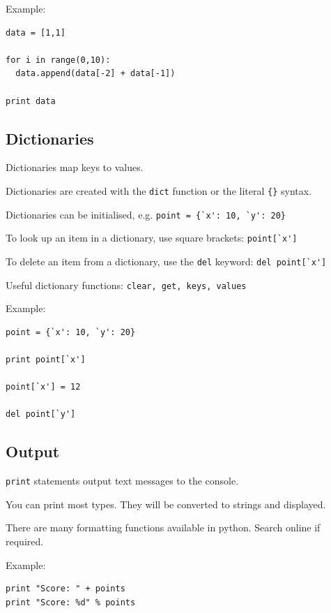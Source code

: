 \documentclass[12pt,a4paper,twoside]{article}
\renewcommand{\_}{\texttt{\symbol{95}}}
\begin{document}
Example:
\begin{verbatim}
data = [1,1]

for i in range(0,10):
  data.append(data[-2] + data[-1])

print data
\end{verbatim}

\subsection{Dictionaries}

\begin{bulletlist}
\item Dictionaries map keys to values.
\item Dictionaries are created with the \verb^dict^ function or the literal \verb^{}^ syntax.
\item Dictionaries can be initialised, e.g. \verb^point = {`x': 10, `y': 20}^
\item To look up an item in a dictionary, use square brackets: \verb^point[`x']^
\item To delete an item from a dictionary, use the \verb^del^ keyword: \verb^del point[`x']^
\item Useful dictionary functions: \verb^clear, get, keys, values^
\end{bulletlist}

Example:
\begin{verbatim}
point = {`x': 10, `y': 20}

print point[`x']

point[`x'] = 12

del point[`y']
\end{verbatim}

\subsection{Output}

\begin{bulletlist}
\item \verb^print^ statements output text messages to the console.
\item You can print most types. They will be converted to strings and displayed.
\item There are many formatting functions available in python. Search online if required.
\end{bulletlist}

Example:
\begin{verbatim}
print "Score: " + points
print "Score: %d" % points
\end{verbatim}
\end{document}
